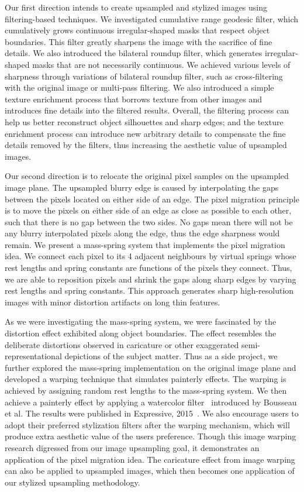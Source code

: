 Our first direction intends to create upsampled and stylized images using filtering-based techniques. We investigated cumulative range geodesic filter, which cumulatively grows continuous irregular-shaped masks that respect object boundaries. This filter greatly sharpens the image with the sacrifice of fine details. We also introduced the bilateral roundup filter, which generates irregular-shaped masks that are not necessarily continuous. We achieved various levels of sharpness through variations of bilateral roundup filter, such as cross-filtering with the original image or multi-pass filtering. 
We also introduced a simple texture enrichment process that borrows texture from other images and introduces fine details into the filtered results. Overall, the filtering process can help us better reconstruct object silhouettes and sharp edges; and the texture enrichment process can introduce new arbitrary details to compensate the fine details removed by the filters, thus increasing the aesthetic value of upsampled images. 


Our second direction is to relocate the original pixel samples on the upsampled image plane. The upsampled blurry edge is caused by interpolating the gaps between the pixels located on either side of an edge. The pixel migration principle is to move the pixels on either side of an edge as close as possible to each other, such that there is no gap between the two sides. No gaps mean there will not be any blurry interpolated pixels along the edge, thus the edge sharpness would remain. We present a mass-spring system that implements the pixel migration idea. We connect each pixel to its 4 adjacent neighbours by virtual springs whose rest lengths and spring constants are functions of the pixels they connect. Thus, we are able to reposition pixels and shrink the gaps along sharp edges by varying rest lengths and spring constants. This approach generates sharp high-resolution images with minor distortion artifacts on long thin features. 

As we were investigating the mass-spring system, we were fascinated by the distortion effect exhibited along object boundaries. The effect resembles the deliberate distortions observed in caricature or other exaggerated semi-representational depictions of the subject matter. Thus as a side project, we further explored the mass-spring implementation on the original image plane and developed a warping technique that simulates painterly effects. The warping is achieved by assigning random rest lengths to the mass-spring system. We then achieve a painterly effect by applying a watercolor filter~\cite{Bousseau:2007} introduced by Bousseau et al. The results were published in Expressive, 2015~\cite{li}. We also encourage users to adopt their preferred stylization filters after the warping mechanism, which will produce extra aesthetic value of the user\textquotesingle s preference. Though this image warping research digressed from our image upsampling goal, it demonstrates an application of the pixel migration idea. The caricature effect from image warping can also be applied to upsampled images, which then becomes one application of our stylized upsampling methodology.

